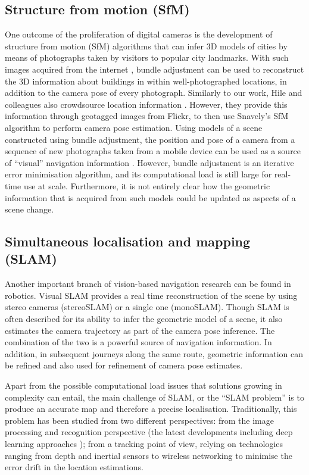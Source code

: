 \subsection{Structure from motion (SfM)}

One outcome of the proliferation of digital cameras is the development of structure from motion (SfM) algorithms that can infer 3D models of cities \citep{agarwal2011building} by means of photographs taken by visitors to popular city landmarks. With such images acquired from the internet \citep{snavely2006photo}, bundle adjustment can be used to reconstruct the 3D information about buildings in within well-photographed locations, in addition to the camera pose of every photograph. Similarly to our work, Hile and colleagues also crowdsource location information \citep{hile2010visual}. However, they provide this information through geotagged images from Flickr, to then use Snavely's SfM algorithm \citep{snavely2006photo} to perform camera pose estimation. Using models of a scene constructed using bundle adjustment, the position and pose of a camera from a sequence of new photographs taken from a mobile device can be used as a source of ``visual'' navigation information \citep{ventura2014global}.  However, bundle adjustment is an iterative error minimisation algorithm, and its computational load is still large for real-time use at scale.  Furthermore, it is not entirely clear how the geometric information that is acquired from such models could be updated as aspects of a scene change.


\subsection{Simultaneous localisation and mapping (SLAM)}

Another important branch of vision-based navigation research can be found in robotics. Visual SLAM \citep{konolige2007frame,engelhard2011real,neira2008guest} provides a real time reconstruction of the scene by using stereo cameras (stereoSLAM) or a single one (monoSLAM). Though SLAM is often described for its ability to infer the geometric model of a scene, it also estimates the camera trajectory as part of the camera pose inference. The combination of the two is a powerful source of navigation information. In addition, in subsequent journeys along the same route, geometric information can be refined and also used for refinement of camera pose estimates.

Apart from the possible computational load issues that solutions growing in complexity can entail, the main challenge of SLAM, or the ``SLAM problem'' is to produce an accurate map and therefore a precise localisation. Traditionally, this problem has been studied from two different perspectives: from the image processing and recognition perspective (the latest developments including deep learning approaches \citep{chen2014convolutional}); from a tracking point of view, relying on technologies ranging from depth and inertial sensors to wireless networking to minimise the error drift in the location estimations.

